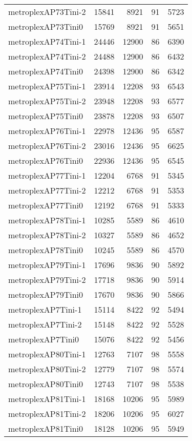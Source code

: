 \documentclass[../../../thesis.tex]{subfiles}
\begin{document}
\begin{longtable}{lrrrr}
metroplexAP73Tini-2 & 15841 & 8921 & 91 & 5723 \\
metroplexAP73Tini0 & 15769 & 8921 & 91 & 5651 \\
metroplexAP74Tini-1 & 24446 & 12900 & 86 & 6390 \\
metroplexAP74Tini-2 & 24488 & 12900 & 86 & 6432 \\
metroplexAP74Tini0 & 24398 & 12900 & 86 & 6342 \\
metroplexAP75Tini-1 & 23914 & 12208 & 93 & 6543 \\
metroplexAP75Tini-2 & 23948 & 12208 & 93 & 6577 \\
metroplexAP75Tini0 & 23878 & 12208 & 93 & 6507 \\
metroplexAP76Tini-1 & 22978 & 12436 & 95 & 6587 \\
metroplexAP76Tini-2 & 23016 & 12436 & 95 & 6625 \\
metroplexAP76Tini0 & 22936 & 12436 & 95 & 6545 \\
metroplexAP77Tini-1 & 12204 & 6768 & 91 & 5345 \\
metroplexAP77Tini-2 & 12212 & 6768 & 91 & 5353 \\
metroplexAP77Tini0 & 12192 & 6768 & 91 & 5333 \\
metroplexAP78Tini-1 & 10285 & 5589 & 86 & 4610 \\
metroplexAP78Tini-2 & 10327 & 5589 & 86 & 4652 \\
metroplexAP78Tini0 & 10245 & 5589 & 86 & 4570 \\
metroplexAP79Tini-1 & 17696 & 9836 & 90 & 5892 \\
metroplexAP79Tini-2 & 17718 & 9836 & 90 & 5914 \\
metroplexAP79Tini0 & 17670 & 9836 & 90 & 5866 \\
metroplexAP7Tini-1 & 15114 & 8422 & 92 & 5494 \\
metroplexAP7Tini-2 & 15148 & 8422 & 92 & 5528 \\
metroplexAP7Tini0 & 15076 & 8422 & 92 & 5456 \\
metroplexAP80Tini-1 & 12763 & 7107 & 98 & 5558 \\
metroplexAP80Tini-2 & 12779 & 7107 & 98 & 5574 \\
metroplexAP80Tini0 & 12743 & 7107 & 98 & 5538 \\
metroplexAP81Tini-1 & 18168 & 10206 & 95 & 5989 \\
metroplexAP81Tini-2 & 18206 & 10206 & 95 & 6027 \\
metroplexAP81Tini0 & 18128 & 10206 & 95 & 5949 \\

\end{longtable}
\end{document}
